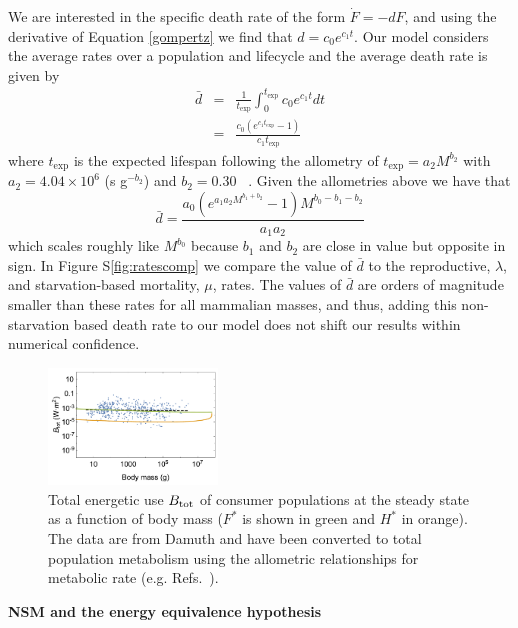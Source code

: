 \documentclass[twocolumn,preprintnumbers,amsmath,amssymb,superscriptaddress]{revtex4}
\begin{document}
\begin{bibunit}[unsrt]
We are interested in the specific death rate of the form $\dot{F}=-dF$, and using the derivative of Equation \ref{gompertz} we find that $d=c_{0}e^{c_{1}t}$. Our model considers the average rates over a population and lifecycle and the average death rate is given by 
\begin{eqnarray}
\bar{d}&=&\frac{1}{t_{\text{exp}}}\int_{0}^{t_{\text{exp}}}c_{0}e^{c_{1}t} dt \\
&=&\frac{c_{0}\left(e^{c_{1} t_{\text{exp}}}-1\right)}{c_{1}t_{\text{exp}}}
\end{eqnarray}
where $t_{\text{exp}}$ is the expected lifespan following the allometry of $t_{\text{exp}}=a_{2}M^{b_{2}}$ with $a_{2}=4.04\times10^{6}$ (s g$^{-b_{2}}$) and $b_{2}=0.30$ ~\cite{damuth1982analysis,calder1984}. Given the allometries above we have that
\begin{equation}
\bar{d}=\frac{a_{0} \left(e^{a_{1}a_{2}M^{b_{1}+b_{2}}}-1\right) M^{b_{0}-b_{1}-b_{2}}}{a_{1} a_{2}}
\end{equation}
which scales roughly like $M^{b_{0}}$ because $b_{1}$ and $b_{2}$ are close in value but opposite in sign. In Figure S\ref{fig:ratescomp} we compare the value of $\bar{d}$ to the reproductive, $\lambda$, and starvation-based mortality, $\mu$, rates. The values of $\bar{d}$ are orders of magnitude smaller than these rates for all mammalian masses, and thus, adding this non-starvation based death rate to our model does not shift our results within numerical confidence. 

\begin{figure}[h!]
\centering
\includegraphics[width=0.4\textwidth]{fig_FPenergyequiv-eps-converted-to.pdf}
\caption{\small{ Total energetic use $B_{\rm tot}$ of consumer populations at the steady state as a function of body mass ($F^*$ is shown in green and $H^*$ in orange).  The data are from Damuth \citep{Damuth:1987kr} and have been converted to
  total population metabolism using the allometric relationships for
  metabolic rate (e.g. Refs.~\citep{West:2001bv,hou,moses2008rmo}).}\label{fig:equivalence}}
\end{figure}

{\bf NSM and the energy equivalence hypothesis}


\end{bibunit}
\end{document}
